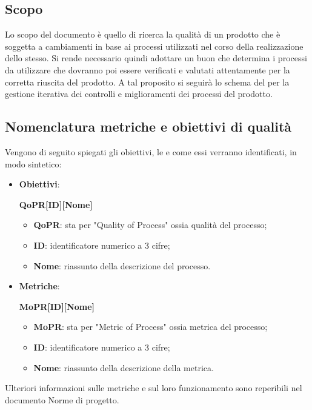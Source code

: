 \documentclass[../piano-di-qualifica.tex]{subfiles}
\begin{document}
\subsection{Scopo}%
\label{sub:scopo}
Lo scopo del documento è quello di ricerca la qualità di un prodotto che è soggetta a cambiamenti in base ai processi utilizzati nel corso della realizzazione dello stesso.
Si rende necessario quindi adottare un buon  che determina i processi da utilizzare che dovranno poi essere verificati e valutati attentamente per la corretta riuscita del prodotto.
A tal proposito si seguirà lo schema del  per la gestione iterativa dei controlli e miglioramenti dei processi del prodotto.

\subsection{Nomenclatura metriche e obiettivi di qualità}%
\label{sub:nomenclatura_metriche_e_obiettivi_di_qualita}
Vengono di seguito spiegati gli obiettivi, le  e come essi verranno identificati, in modo sintetico:
\begin{itemize}
    \item \textbf{Obiettivi}: 
    \begin{center}
        \centering
        \textbf{QoPR[ID][Nome]}
    \end{center}
        \begin{itemize}
            \item \textbf{QoPR}: sta per "Quality of Process" ossia qualità del processo;
            \item \textbf{ID}: identificatore numerico a 3 cifre;
            \item \textbf{Nome}: riassunto della descrizione del processo.
        \end{itemize}
    \item \textbf{Metriche}: 
    \begin{center}
        \centering
        \textbf{MoPR[ID][Nome]}
    \end{center}
        \begin{itemize}
            \item \textbf{MoPR}: sta per "Metric of Process" ossia metrica del processo;
            \item \textbf{ID}: identificatore numerico a 3 cifre;
            \item \textbf{Nome}: riassunto della descrizione della metrica.
        \end{itemize}
\end{itemize}  
Ulteriori informazioni sulle metriche e sul loro funzionamento sono reperibili nel documento Norme di progetto.
\end{document}
